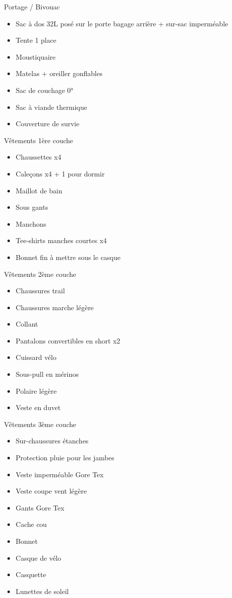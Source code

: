  Portage / Bivouac \newline
 \begin{itemize}
 \item Sac à dos 32L posé sur le porte bagage arrière + sur-sac imperméable
 \item Tente 1 place
 \item Moustiquaire
 \item Matelas + oreiller gonflables
 \item Sac de couchage 0°
 \item Sac à viande thermique
 \item Couverture de survie
 \end{itemize}
 Vêtements 1ère couche \newline
 \begin{itemize}
 \item Chaussettes x4
 \item Caleçons x4 + 1 pour dormir
 \item Maillot de bain
 \item Sous gants
 \item Manchons
 \item Tee-shirts manches courtes x4
 \item Bonnet fin à mettre sous le casque
 \end{itemize}
 Vêtements 2ème couche \newline
 \begin{itemize}
 \item Chaussures trail
 \item Chaussures marche légère
 \item Collant
 \item Pantalons convertibles en short x2
 \item Cuissard vélo
 \item Sous-pull en mérinos
 \item Polaire légère
 \item Veste en duvet
 \end{itemize}
 Vêtements 3ème couche \newline
 \begin{itemize}
 \item Sur-chaussures étanches
 \item Protection pluie pour les jambes
 \item Veste imperméable Gore Tex
 \item Veste coupe vent légère
 \item Gants Gore Tex
 \item Cache cou
 \item Bonnet
 \item Casque de vélo
 \item Casquette
 \item Lunettes de soleil
 \end{itemize}
